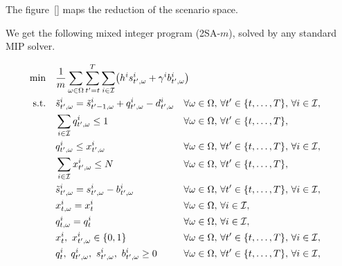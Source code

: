 The figure~\ref{} maps the reduction of the scenario space.


We get the following mixed integer program (2SA-$m$), solved by any standard MIP solver.


\begin{subequations}\label{eq:Uniform-CLSP-BS-2SA-m:backorder}
  \begin{align}
    \min\quad & \rlap{$\ds \frac{1}{m}\sum_{\omega\in\scenarios} \sum_{t'=t}^{\horizon} \sum_{i\in\REF} \bracket{\holding^i\inventory_{t',\omega}^i + \backorder^i\backlog_{t',\omega}^i}$}
    \label{eq:Uniform-CLSP-BS-2SA-m:backorder:objective}
    \\
    \st\quad & \ds \level_{t',\omega}^i = \level_{t'-1,\omega}^i + \quantity_{t',\omega}^i - \demand_{t',\omega}^i && \forall\omega\in\scenarios,\, \forall t'\in\range[t]{\horizon},\, \forall i\in\REF,
    \label{eq:Uniform-CLSP-BS-2SA-m:backorder:inventory-dynamic}
    \\
    & \ds \sum_{i\in\REF} \quantity_{t',\omega}^i \le 1 && \forall\omega\in\scenarios,\, \forall t'\in\range[t]{\horizon},
    \label{eq:Uniform-CLSP-BS-2SA-m:backorder:capacity}
    \\
    & \ds \quantity_{t',\omega}^i \le \setup_{t',\omega}^i && \forall\omega\in\scenarios,\, \forall t'\in\range[t]{\horizon},\, \forall i\in\REF,
    \label{eq:Uniform-CLSP-BS-2SA-m:backorder:big-M}
    \\
    & \ds \sum_{i\in\REF} \setup_{t',\omega}^i \le \nbsetups && \forall\omega\in\scenarios,\, \forall t'\in\range[t]{\horizon},
    \label{eq:Uniform-CLSP-BS-2SA-m:backorder:setups}
    \\
    & \ds \level_{t',\omega}^i = \inventory_{t',\omega}^i - \backlog_{t',\omega}^i && \forall\omega\in\scenarios,\, \forall t'\in\range[t]{\horizon},\, \forall i\in\REF,
    \label{eq:Uniform-CLSP-BS-2SA-m:backorder:inventory}
    \\
    & \ds \setup_{t,\omega}^i = \setup_t^i &&  \forall\omega\in\scenarios,\, \forall i\in\REF,
    \label{eq:Uniform-CLSP-BS-2SA-m:backorder:first-step-setup}
    \\
    & \ds \quantity_{t,\omega}^i = \quantity_t^i &&  \forall\omega\in\scenarios,\, \forall i\in\REF,
    \label{eq:Uniform-CLSP-BS-2SA-m:backorder:first-step-quantity}
    \\
    & \ds \setup_t^i,\ \setup_{t',\omega}^i \in \crbracket{0,1} && \forall\omega\in\scenarios,\, \forall t'\in\range[t]{\horizon},\, \forall i\in\REF,
    \label{eq:Uniform-CLSP-BS-2SA-m:backorder:binary}
    \\
    & \ds \quantity_t^i,\ \quantity_{t',\omega}^i,\ \inventory_{t',\omega}^i,\ \backlog_{t',\omega}^i \ge 0 && \forall\omega\in\scenarios,\, \forall t'\in\range[t]{\horizon},\, \forall i\in\REF,
    \label{eq:Uniform-CLSP-BS-2SA-m:backorder:positity}
  \end{align}
\end{subequations}


